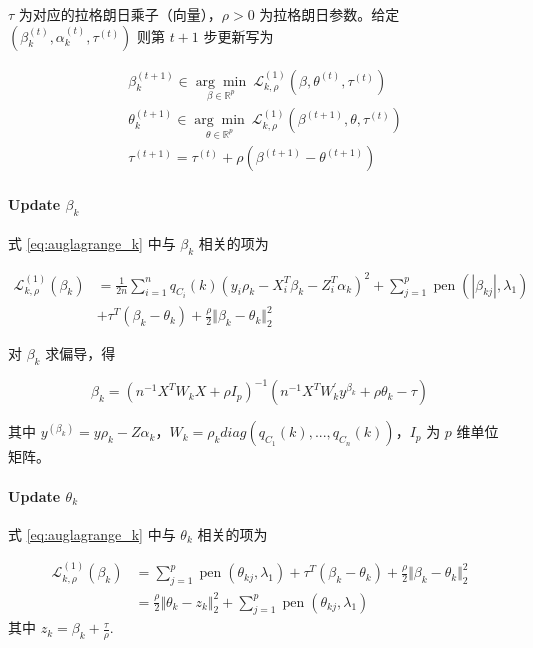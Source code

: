 \documentclass[12pt, a4paper, oneside]{article}
\numberwithin{equation}{section}
\begin{document}
$\tau$ 为对应的拉格朗日乘子（向量），$\rho>0$ 为拉格朗日参数。给定 $(\beta_k^{(t)},\alpha_k^{(t)},\tau^{(t)})$ 则第 $t+1$ 步更新写为

\begin{align}
	&{\beta}_k^{(t+1)} \in \underset{{\beta} \in \mathbb{R}^p}{\arg \min }\  \mathcal{L}_{k,\rho}^{(1)}\left({\beta}, {\theta}^{(t)}, {\tau}^{(t)}\right) \\
	&{\theta}_k^{(t+1)} \in \underset{{\theta} \in \mathbb{R}^p}{\arg \min }\  \mathcal{L}_{k,\rho}^{(1)}\left({\beta}^{(t+1)}, {\theta}, {\tau}^{(t)}\right) \\ 
	&{\tau}^{(t+1)}={\tau}^{(t)}+\rho\left({\beta}^{(t+1)}-{\theta}^{(t+1)}\right) 
\end{align}

\paragraph{Update $\beta_k$}

式 \ref{eq:auglagrange_k} 中与 $\beta_k$ 相关的项为

\begin{equation}
	\begin{aligned}
		\mathcal{L}_{k,\rho}^{(1)}(\beta_k) &=\frac{1}{2n}\sum_{i=1}^{n} q_{C_i}(k)\left(y_i\rho_k - X_i^T \beta_k - Z_i^T \alpha_k \right)^2 + \sum_{j=1}^{p} \operatorname{pen}\left(|\beta_{kj}|, \lambda_{1}\right) \\
		& + \tau^T (\beta_k - \theta_k) + \frac{\rho}{2}\Vert\beta_k - \theta_k\Vert_2^2
	\end{aligned}
\end{equation}

对 $\beta_k$ 求偏导，得

\begin{equation}
	\beta_k = \left(n^{-1}X^TW_k X+\rho I_p \right)^{-1}\left(n^{-1}X^T W^\prime_k y^{\beta_k}+\rho \theta_k-\tau\right)
\end{equation}

其中 $y^{(\beta_k)} = y\rho_k - Z\alpha_k$，$ W_k = \rho_k diag(q_{C_1}(k),...,q_{C_n}(k))$，$I_p$ 为 $p$ 维单位矩阵。

\paragraph{Update $\theta_k$}

式 \ref{eq:auglagrange_k} 中与 $\theta_k$ 相关的项为

\begin{equation}
	\begin{aligned}
		\mathcal{L}_{k,\rho}^{(1)}(\beta_k) &= \sum_{j=1}^{p}\operatorname{pen}\left(\theta_{kj}, \lambda_{1}\right) + \tau^T (\beta_k - \theta_k) + \frac{\rho}{2}\Vert\beta_k - \theta_k\Vert_2^2 \\
		&= \frac{\rho}{2}\Vert\theta_k - z_k\Vert_2^2 +  \sum_{j=1}^{p}\operatorname{pen}\left(\theta_{kj}, \lambda_{1}\right)
	\end{aligned}
\end{equation}
其中 $z_k = \beta_k + \frac{\tau}{\rho}$.
\end{document}
